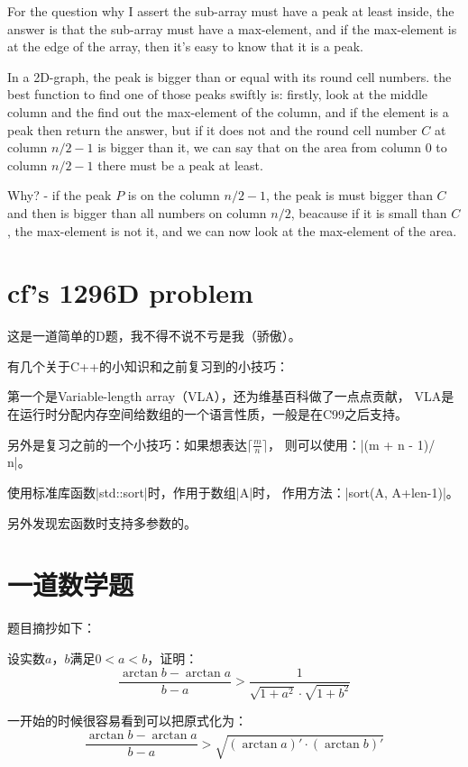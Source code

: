 For the question why I assert the sub-array must have a peak at least inside,
the answer is that the sub-array must have a max-element, and if the max-element
is at the edge of the array, then it's easy to know that it is a peak.

In a 2D-graph, the peak is bigger than or equal with its round cell numbers. the
best function to find one of those peaks swiftly is: firstly, look at the middle
column and the find out the max-element of the column, and if the element is a
peak then return the answer, but if it does not and the round cell number $C$ at
column $n/2-1$ is bigger than it, we can say that on the area from column $0$ to
column $n/2-1$ there must be a peak at least.

Why? - if the peak $P$ is on the column $n/2-1$, the peak is must bigger than
$C$ and then is bigger than all numbers on column $n/2$, beacause if it is small
than $C$, the max-element is not it, and we can now look at the max-element of
the area.


\section{cf's 1296D problem}

这是一道简单的D题，我不得不说不亏是我（骄傲）。

有几个关于C++的小知识和之前复习到的小技巧：

第一个是Variable-length array（VLA），还为维基百科做了一点点贡献，
VLA是在运行时分配内存空间给数组的一个语言性质，一般是在C99之后支持。

另外是复习之前的一个小技巧：如果想表达$\lceil\frac{m}{n}\rceil$，
则可以使用：\vb|(m + n - 1)/ n|。

使用标准库函数\vb|std::sort|时，作用于数组\vb|A|时，
作用方法：\vb|sort(A, A+len-1)|。

另外发现宏函数时支持多参数的。


\section{一道数学题}

题目摘抄如下：

设实数$a$，$b$满足$0<a<b$，证明：
$$\frac{\arctan b-\arctan a}{b-a}
>\frac{1}{\sqrt{1+a^2}\cdot\sqrt{1+b^2}}$$

一开始的时候很容易看到可以把原式化为：
$$\frac{\arctan b-\arctan a}{b-a}>
\sqrt{(\arctan a)'\cdot(\arctan b)'}$$

